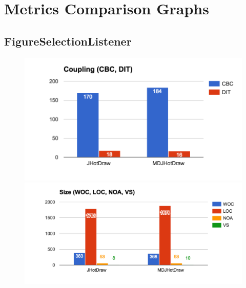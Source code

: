 \section{Metrics Comparison Graphs}

\subsection{FigureSelectionListener}

\begin{figure}[H]
	\includegraphics[scale=0.5]{figures/metrics/Metric_Observer_Coupling.png}
	\includegraphics[scale=0.45]{figures/metrics/Metric_Observer_Size.png}


\end{figure}

